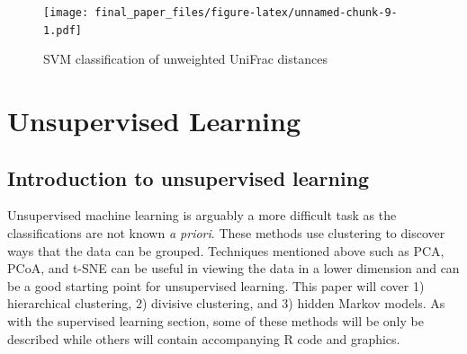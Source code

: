 \documentclass[12pt,openany]{book}
\newenvironment{Shaded}{\begin{snugshade}}{\end{snugshade}}
\newcommand{\KeywordTok}[1]{\textcolor[rgb]{0.13,0.29,0.53}{\textbf{#1}}}
\newcommand{\DataTypeTok}[1]{\textcolor[rgb]{0.13,0.29,0.53}{#1}}
\newcommand{\DecValTok}[1]{\textcolor[rgb]{0.00,0.00,0.81}{#1}}
\newcommand{\FloatTok}[1]{\textcolor[rgb]{0.00,0.00,0.81}{#1}}
\newcommand{\StringTok}[1]{\textcolor[rgb]{0.31,0.60,0.02}{#1}}
\newcommand{\CommentTok}[1]{\textcolor[rgb]{0.56,0.35,0.01}{\textit{#1}}}
\newcommand{\OtherTok}[1]{\textcolor[rgb]{0.56,0.35,0.01}{#1}}
\newcommand{\OperatorTok}[1]{\textcolor[rgb]{0.81,0.36,0.00}{\textbf{#1}}}
\newcommand{\NormalTok}[1]{#1}
\begin{document}
\begin{Shaded}
\end{Shaded}

\begin{figure}
\centering
\texttt{[image: final\_paper\_files/figure-latex/unnamed-chunk-9-1.pdf]}
\caption{\label{fig:unnamed-chunk-9}SVM classification of unweighted UniFrac
distances}
\end{figure}

\chapter{Unsupervised Learning}\label{unsup_learn}

\section{Introduction to unsupervised
learning}\label{introduction-to-unsupervised-learning}

Unsupervised machine learning is arguably a more difficult task as the
classifications are not known \emph{a priori}. These methods use
clustering to discover ways that the data can be grouped. Techniques
mentioned above such as PCA, PCoA, and t-SNE can be useful in viewing
the data in a lower dimension and can be a good starting point for
unsupervised learning. This paper will cover 1) hierarchical clustering,
2) divisive clustering, and 3) hidden Markov models. As with the
supervised learning section, some of these methods will be only be
described while others will contain accompanying R code and graphics.
\end{document}
